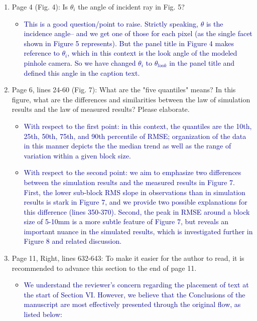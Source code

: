\documentclass[14pt,letterpaper]{article}
\begin{document}
\begin{enumerate}
\begin{itemize}
    \end{itemize}
    \item Page 4 (Fig. 4): Is $\theta_i$ the angle of incident ray in Fig. 5?
    \begin{itemize}
        \item \textcolor{darkblue}{This is a good question/point to raise. Strictly speaking, $\theta$ is the incidence angle-- and we get one of those for each pixel (as the single facet shown in Figure 5 represents). But the panel title in Figure 4 makes reference to $\theta_i$, which in this context is the look angle of the modeled pinhole camera. So we have changed $\theta_i$ to $\theta_{look}$ in the panel title and defined this angle in the caption text.}
    \end{itemize}
    \item Page 6, lines 24-60 (Fig. 7): What are the "five quantiles" means? In this figure, what are the differences and similarities between the law of simulation results and the law of measured results? Please elaborate.
    \begin{itemize}
        \item \textcolor{darkblue}{With respect to the first point: in this context, the quantiles are the 10th, 25th, 50th, 75th, and 90th percentile of RMSE; organization of the data in this manner depicts the the median trend as well as the range of variation within a given block size.}
        \item \textcolor{darkblue}{With respect to the second point: we aim to emphasize two differences between the simulation results and the measured results in Figure 7. First, the lower sub-block RMS slope in observations than in simulation results is stark in Figure 7, and we provide two possible explanations for this difference (lines 350-370). Second, the peak in RMSE around a block size of 5-10mm is a more subtle feature of Figure 7, but reveals an important nuance in the simulated results, which is investigated further in Figure 8 and related discussion.}
    \end{itemize}
    \item Page 11, Right, lines 632-643: To make it easier for the author to read, it is recommended to advance this section to the end of page 11.
    \begin{itemize}
        \item \textcolor{darkblue}{We understand the reviewer's concern regarding the placement of text at the start of Section VI. However, we believe that the Conclusions of the manuscript are most effectively presented through the original flow, as listed below:
}
\end{itemize}
\end{enumerate}
\end{document}

